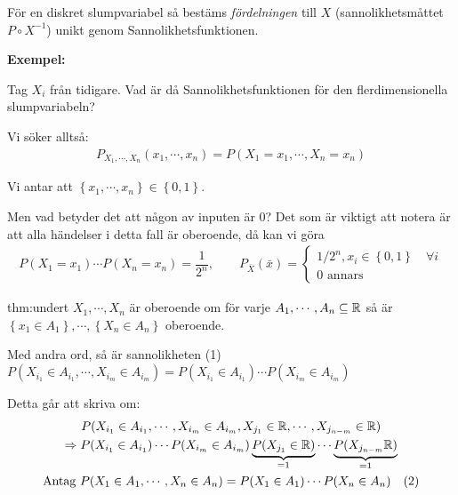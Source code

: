 \par\bigskip
\noindent För en diskret slumpvariabel så bestäms \textit{fördelningen} till $X$ (sannolikhetsmåttet $P\circ X^{-1}$) unikt genom Sannolikhetsfunktionen.
\par\bigskip
\noindent\textbf{Exempel:}\par
\noindent Tag $X_i$ från tidigare. Vad är då Sannolikhetsfunktionen för den flerdimensionella slumpvariabeln?\par
\noindent Vi söker alltså:
\begin{equation*}
  \begin{gathered}
    P_{X_1,\cdots,X_n}(x_1,\cdots,x_n) = P(X_1=x_1,\cdots,X_n=x_n)
  \end{gathered}
\end{equation*}\par
\noindent Vi antar att $\left\{x_1,\cdots,x_n\right\}\in\left\{0,1\right\}$. \par
\noindent Men vad betyder det att någon av inputen är 0? Det som är viktigt att notera är att alla händelser i detta fall är oberoende, då kan vi göra
\begin{equation*}
  \begin{gathered}
    P(X_1=x_1)\cdots P(X_n=x_n)=\dfrac{1}{2^n},\qquad P_{\bar{X}}(\bar{x}) = 
    \begin{cases*}
    1/2^n, x_i\in\left\{0,1\right\}\quad\forall i\\
    0\text{ annars}
    \end{cases*}
  \end{gathered}
\end{equation*}
\par\bigskip
\begin{theo}{thm:undert}
$X_1,\cdots,X_n$ är oberoende om för varje $A_1,\cdots,A_n\subseteq\mathbb{R}$ så är $\left\{x_1\in A_1\right\},\cdots,\left\{X_n\in A_n\right\}$ oberoende.
\end{theo}
\par\bigskip
\noindent Med andra ord, så är sannolikheten (1) $P(X_{i_{1}}\in A_{i_{1}},\cdots,X_{i_{m}}\in A_{i_{m}}) = P(X_{i_{1}}\in A_{i_{1}})\cdots P(X_{i_{m}}\in A_{i_{m}})$\par
\noindent Detta går att skriva om:
\begin{equation*}
  \begin{gathered}
    P(X_{i_{1}}\in A_{i_{1}},\cdots, X_{i_{m}}\in A_{i_{m}}, X_{j_{1}}\in\mathbb{R},\cdots, X_{j_{n-m}}\in\mathbb{R})\\
    \Rightarrow P(X_{i_{1}}\in A_{i_{1}})\cdots P(X_{i_{m}}\in A_{i_{m}})\underbrace{P(X_{j_{1}}\in\mathbb{R})}_{\text{=1}}\cdots \underbrace{P(X_{j_{n-m}}\mathbb{R})}_{\text{=1}}\\
    \text{Antag } P(X_1\in A_1,\cdots, X_n\in A_n) = P(X_1\in A_1)\cdots P(X_n\in A_n)\quad (2)
  \end{gathered}
\end{equation*}
